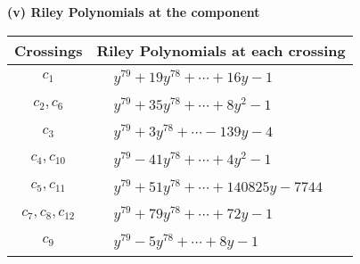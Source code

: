 \documentclass[1p]{elsarticle_modified}
\theoremstyle{definition}
\begin{document}
\newpage\renewcommand{\arraystretch}{1}
\flushleft \textbf{(v) Riley Polynomials at the component}\newline \\
\begin{tabular}{m{50pt}|m{274pt}}
Crossings & \hspace{64pt}Riley Polynomials at each crossing \\
\hline $$\begin{aligned}c_{1}\end{aligned}$$&$\begin{aligned}
&y^{79}+19 y^{78}+\cdots+16 y-1
\end{aligned}$\\
\hline $$\begin{aligned}c_{2},c_{6}\end{aligned}$$&$\begin{aligned}
&y^{79}+35 y^{78}+\cdots+8 y^2-1
\end{aligned}$\\
\hline $$\begin{aligned}c_{3}\end{aligned}$$&$\begin{aligned}
&y^{79}+3 y^{78}+\cdots-139 y-4
\end{aligned}$\\
\hline $$\begin{aligned}c_{4},c_{10}\end{aligned}$$&$\begin{aligned}
&y^{79}-41 y^{78}+\cdots+4 y^2-1
\end{aligned}$\\
\hline $$\begin{aligned}c_{5},c_{11}\end{aligned}$$&$\begin{aligned}
&y^{79}+51 y^{78}+\cdots+140825 y-7744
\end{aligned}$\\
\hline $$\begin{aligned}c_{7},c_{8},c_{12}\end{aligned}$$&$\begin{aligned}
&y^{79}+79 y^{78}+\cdots+72 y-1
\end{aligned}$\\
\hline $$\begin{aligned}c_{9}\end{aligned}$$&$\begin{aligned}
&y^{79}-5 y^{78}+\cdots+8 y-1
\end{aligned}$\\
\hline
\end{tabular}\\~\\
\end{document}
